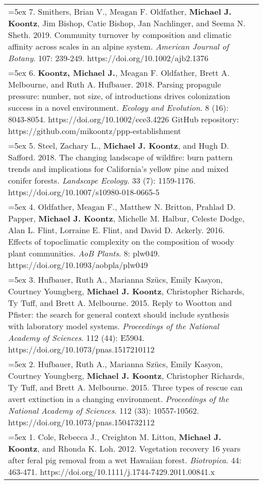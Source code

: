 \begin{longtable}{@{} >{\raggedright}p{6.25in} >{\raggedleft}X @{}}
\hangindent=5ex 7. Smithers, Brian V., Meagan F. Oldfather, \textbf{Michael J. Koontz}, Jim Bishop, Catie Bishop, Jan Nachlinger, and Seema N. Sheth. 2019. Community turnover by composition and climatic affinity across scales in an alpine system. \emph{American Journal of Botany}. 107: 239-249. https://doi.org/10.1002/ajb2.1376 & \tabularnewline

\hangindent=5ex 6. \textbf{Koontz, Michael J.}, Meagan F. Oldfather, Brett A. Melbourne, and Ruth A. Hufbauer. 2018. Parsing propagule pressure: number, not size, of introductions drives colonization success in a novel environment. \emph{Ecology and Evolution}. 8 (16): 8043-8054. https://doi.org/10.1002/ece3.4226 
\newline GitHub repository: https://github.com/mikoontz/ppp-establishment & \tabularnewline

\hangindent=5ex 5. Steel, Zachary L., \textbf{Michael J. Koontz}, and Hugh D. Safford. 2018. The changing landscape of wildfire: burn pattern trends and implications for California's yellow pine and mixed conifer forests. \emph{Landscape Ecology}. 33 (7): 1159-1176. https://doi.org/10.1007/s10980-018-0665-5 &  \tabularnewline

\hangindent=5ex 4. Oldfather, Meagan F., Matthew N. Britton, Prahlad D. Papper, \textbf{Michael J. Koontz}, Michelle M. Halbur, Celeste Dodge, Alan L. Flint, Lorraine E. Flint, and David D. Ackerly. 2016. Effects of topoclimatic complexity on the composition of woody plant communities. \emph{AoB Plants}. 8: plw049. https://doi.org/10.1093/aobpla/plw049 &  \tabularnewline

\hangindent=5ex 3. Hufbauer, Ruth A., Marianna Sz\"ucs, Emily Kasyon, Courtney Youngberg, \textbf{Michael J. Koontz}, Christopher Richards, Ty Tuff, and Brett A. Melbourne. 2015. Reply to Wootton and Pfister: the search for general context should include synthesis with laboratory model systems. \emph{Proceedings of the National Academy of Sciences}. 112 (44): E5904. https://doi.org/10.1073/pnas.1517210112 &  \tabularnewline

\hangindent=5ex 2. Hufbauer, Ruth A., Marianna Sz\"ucs, Emily Kasyon, Courtney Youngberg, \textbf{Michael J. Koontz}, Christopher Richards, Ty Tuff, and Brett A. Melbourne. 2015. Three types of rescue can avert extinction in a changing environment. \emph{Proceedings of the National Academy of Sciences}. 112 (33): 10557-10562. https://doi.org/10.1073/pnas.1504732112 &  \tabularnewline

\hangindent=5ex 1. Cole, Rebecca J., Creighton M. Litton, \textbf{Michael J. Koontz}, and Rhonda K. Loh. 2012. Vegetation recovery 16 years after feral pig removal from
a wet Hawaiian forest. \emph{Biotropica}. 44: 463-471. https://doi.org/10.1111/j.1744-7429.2011.00841.x &  \tabularnewline

\end{longtable}